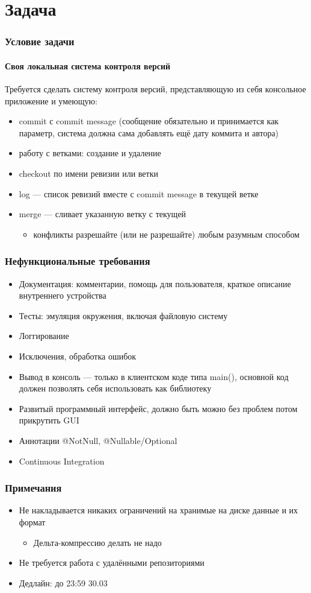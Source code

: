 \documentclass[xetex,mathserif,serif]{beamer}
\begin{document}
	\section{Задача}

	\begin{frame}
		\frametitle{Условие задачи}
		\framesubtitle{Своя локальная система контроля версий}
		Требуется сделать систему контроля версий, представляющую из себя консольное приложение и умеющую:
		\begin{itemize}
			\item commit с commit message (сообщение обязательно и принимается как параметр, система должна сама добавлять ещё дату коммита и автора)
			\item работу с ветками: создание и удаление
			\item checkout по имени ревизии или ветки
			\item log --- список ревизий вместе с commit message в текущей ветке
			\item merge --- сливает указанную ветку с текущей
			\begin{itemize}
				\item конфликты разрешайте (или не разрешайте) любым разумным способом
			\end{itemize}
		\end{itemize}
	\end{frame}

	\begin{frame}
		\frametitle{Нефункциональные требования}
		\begin{itemize}
			\item Документация: комментарии, помощь для пользователя, краткое описание внутреннего устройства
			\item Тесты: эмуляция окружения, включая файловую систему
			\item Логгирование
			\item Исключения, обработка ошибок
			\item Вывод в консоль --- только в клиентском коде типа main(), основной код должен позволять себя использовать как библиотеку
			\item Развитый программный интерфейс, должно быть можно без проблем потом прикрутить GUI
			\item Аннотации @NotNull, @Nullable/Optional
			\item Continuous Integration
		\end{itemize}
	\end{frame}

	\begin{frame}
		\frametitle{Примечания}
		\begin{itemize}
			\item Не накладывается никаких ограничений на хранимые на диске данные и их формат
			\begin{itemize}
				\item Дельта-компрессию делать не надо
			\end{itemize}
			\item Не требуется работа с удалёнными репозиториями
			\item Дедлайн: до 23:59 30.03
		\end{itemize}
	\end{frame}
\end{document}
